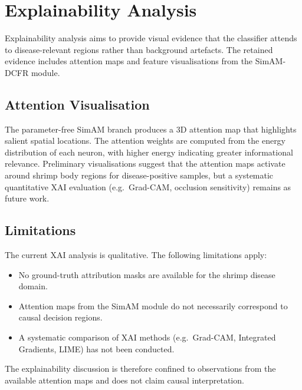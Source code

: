 
\section{Explainability Analysis}
\label{sec:xai}

Explainability analysis aims to provide visual evidence that the classifier attends to disease-relevant regions rather than background artefacts. The retained evidence includes attention maps and feature visualisations from the SimAM-DCFR module.

\subsection{Attention Visualisation}
\label{sec:attention-vis}

The parameter-free SimAM branch produces a 3D attention map that highlights salient spatial locations. The attention weights are computed from the energy distribution of each neuron, with higher energy indicating greater informational relevance. Preliminary visualisations suggest that the attention maps activate around shrimp body regions for disease-positive samples, but a systematic quantitative XAI evaluation (e.g.~Grad-CAM, occlusion sensitivity) remains as future work.

\subsection{Limitations}
\label{sec:xai-limitations}

The current XAI analysis is qualitative. The following limitations apply:

\begin{itemize}
    \item No ground-truth attribution masks are available for the shrimp disease domain.
    \item Attention maps from the SimAM module do not necessarily correspond to causal decision regions.
    \item A systematic comparison of XAI methods (e.g.~Grad-CAM, Integrated Gradients, LIME) has not been conducted.
\end{itemize}

The explainability discussion is therefore confined to observations from the available attention maps and does not claim causal interpretation.